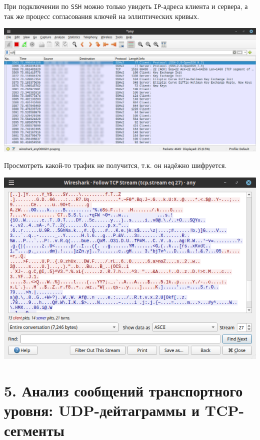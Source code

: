 \newpage

При подключении по \texttt{SSH} можно только увидеть \texttt{IP}-адреса клиента и сервера, а так же процесс согласования ключей на эллиптических кривых.

\begin{center}
    \includegraphics[scale=0.55]{res/5.wireshark-ssh.png}
\end{center}

Просмотреть какой-то трафик не получится, т.к. он надёжно шифруется.

\begin{center}
    \includegraphics[scale=0.55]{res/5.wireshark-ssh-follow.png}
\end{center}


\section*{5. Анализ сообщений транспортного уровня: UDP-дейтаграммы и TCP-сегменты}

